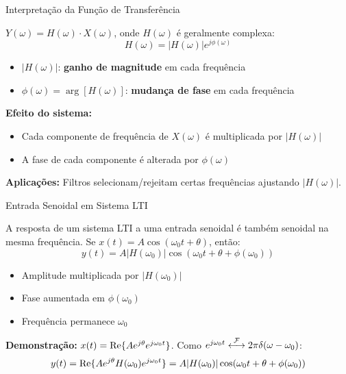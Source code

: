
\begin{frame}{Interpretação da Função de Transferência}

$Y(\omega) = H(\omega) \cdot X(\omega)$, onde $H(\omega)$ é geralmente complexa:
\[
H(\omega) = |H(\omega)| e^{j\phi(\omega)}
\]

\begin{itemize}
\item $|H(\omega)|$: \textbf{ganho de magnitude} em cada frequência
\item $\phi(\omega) = \arg[H(\omega)]$: \textbf{mudança de fase} em cada frequência
\end{itemize}

\vspace{0.2cm}

\textbf{Efeito do sistema:}
\begin{itemize}
\item Cada componente de frequência de $X(\omega)$ é multiplicada por $|H(\omega)|$
\item A fase de cada componente é alterada por $\phi(\omega)$
\end{itemize}

\vspace{0.2cm}

\textbf{Aplicações:} Filtros selecionam/rejeitam certas frequências ajustando $|H(\omega)|$.

\end{frame}


\begin{frame}{Entrada Senoidal em Sistema LTI}

A resposta de um sistema LTI a uma entrada senoidal é também senoidal na mesma frequência. Se $x(t) = A\cos(\omega_0 t + \theta)$, então:
\vspace{-2mm}
\[
y(t) = A|H(\omega_0)| \cos(\omega_0 t + \theta + \phi(\omega_0))
\]
\vspace{-4mm}

\begin{itemize}
\item Amplitude multiplicada por $|H(\omega_0)|$
\item Fase aumentada em $\phi(\omega_0)$
\item Frequência permanece $\omega_0$
\end{itemize}

\textbf{Demonstração:}
$x(t) = \operatorname{Re}\{Ae^{j\theta}e^{j\omega_0 t}\}$.
Como $e^{j\omega_0 t} \mathrel{\overset{\mathcal{F}}{\longleftrightarrow}} 2\pi\delta(\omega - \omega_0)$:
\vspace{-2mm}
\[
y(t) = \operatorname{Re}\{Ae^{j\theta}H(\omega_0)e^{j\omega_0 t}\} = A|H(\omega_0)|\cos(\omega_0 t + \theta + \phi(\omega_0))
\]

\end{frame}

